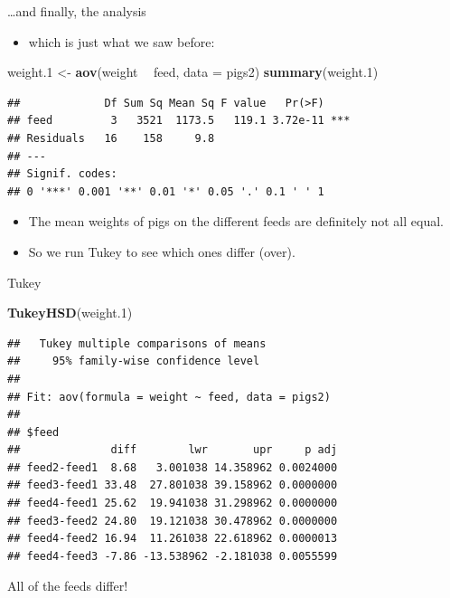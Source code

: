 \documentclass[
  ignorenonframetext,
]{beamer}
\newenvironment{Shaded}{\begin{snugshade}}{\end{snugshade}}
\newcommand{\DataTypeTok}[1]{\textcolor[rgb]{0.13,0.29,0.53}{#1}}
\newcommand{\FloatTok}[1]{\textcolor[rgb]{0.00,0.00,0.81}{#1}}
\newcommand{\KeywordTok}[1]{\textcolor[rgb]{0.13,0.29,0.53}{\textbf{#1}}}
\newcommand{\NormalTok}[1]{#1}
\newcommand{\OperatorTok}[1]{\textcolor[rgb]{0.81,0.36,0.00}{\textbf{#1}}}
\newcommand{\StringTok}[1]{\textcolor[rgb]{0.31,0.60,0.02}{#1}}
\providecommand{\tightlist}{%
  \setlength{\itemsep}{0pt}\setlength{\parskip}{0pt}}
\begin{document}
\begin{frame}[fragile]{\ldots and finally, the analysis}
\protect\hypertarget{and-finally-the-analysis}{}

\begin{itemize}
\tightlist
\item
  which is just what we saw before:
\end{itemize}

\begin{Shaded}
\begin{Highlighting}[]
\NormalTok{weight}\FloatTok{.1}\NormalTok{ <-}\StringTok{ }\KeywordTok{aov}\NormalTok{(weight }\OperatorTok{~}\StringTok{ }\NormalTok{feed, }\DataTypeTok{data =}\NormalTok{ pigs2)}
\KeywordTok{summary}\NormalTok{(weight}\FloatTok{.1}\NormalTok{)}
\end{Highlighting}
\end{Shaded}

\begin{verbatim}
##             Df Sum Sq Mean Sq F value   Pr(>F)    
## feed         3   3521  1173.5   119.1 3.72e-11 ***
## Residuals   16    158     9.8                     
## ---
## Signif. codes:  
## 0 '***' 0.001 '**' 0.01 '*' 0.05 '.' 0.1 ' ' 1
\end{verbatim}

\begin{itemize}
\tightlist
\item
  The mean weights of pigs on the different feeds are definitely not all
  equal.
\item
  So we run Tukey to see which ones differ (over).
\end{itemize}

\end{frame}

\begin{frame}[fragile]{Tukey}
\protect\hypertarget{tukey}{}

\begin{Shaded}
\begin{Highlighting}[]
\KeywordTok{TukeyHSD}\NormalTok{(weight}\FloatTok{.1}\NormalTok{)}
\end{Highlighting}
\end{Shaded}

\begin{verbatim}
##   Tukey multiple comparisons of means
##     95% family-wise confidence level
## 
## Fit: aov(formula = weight ~ feed, data = pigs2)
## 
## $feed
##              diff        lwr       upr     p adj
## feed2-feed1  8.68   3.001038 14.358962 0.0024000
## feed3-feed1 33.48  27.801038 39.158962 0.0000000
## feed4-feed1 25.62  19.941038 31.298962 0.0000000
## feed3-feed2 24.80  19.121038 30.478962 0.0000000
## feed4-feed2 16.94  11.261038 22.618962 0.0000013
## feed4-feed3 -7.86 -13.538962 -2.181038 0.0055599
\end{verbatim}

All of the feeds differ!

\end{frame}
\end{document}
